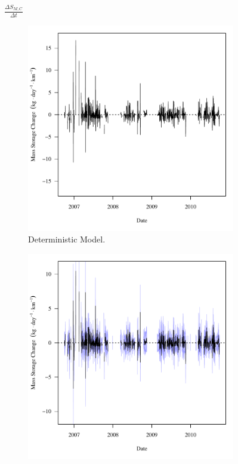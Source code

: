 \begin{linenumbers}
\subfiguremid
\begin{landscape}
	\begin{figure}
		$ \displaystyle \frac{\Delta S_{M,C}}{\Delta t} $
		\begin{subfigure}{0.7\textwidth}
			\centering
			\includegraphics[width=\tableCustomSize]{"Figures/Results_USR/Deterministic/f Segment C"}
			\caption{Deterministic Model.}
		\end{subfigure}%
		\begin{subfigure}{0.7\textwidth}
			\centering
			\includegraphics[width=\tableCustomSize]{"Figures/Results_USR/Stochastic/f Segment C"}

\end{subfigure}
\end{figure}
\end{landscape}
\end{linenumbers}
